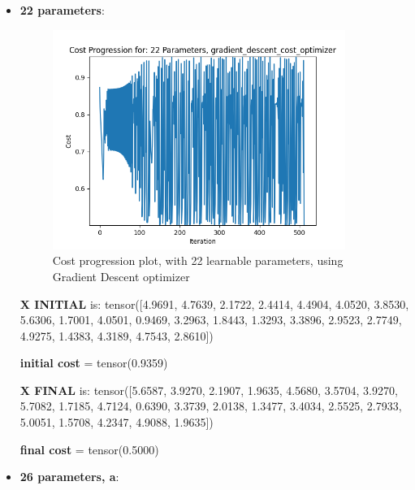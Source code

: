 \documentclass[inscr,ack,preface]{diphdthesis}
\begin{document}
\begin{itemize}
    \item \textbf{22 parameters}:

\begin{figure}[ht]
\begin{center}
    \includegraphics[width=0.9\textwidth]{plots/22.png}
    \caption{Cost progression plot, with 22 learnable parameters, using Gradient Descent optimizer} 
    \label{fig:enter-label}
    \end{center}
\end{figure}

\textbf{X INITIAL} is: tensor([4.9691, 4.7639, 2.1722, 2.4414, 4.4904, 4.0520, 3.8530, 5.6306, 1.7001,
        4.0501, 0.9469, 3.2963, 1.8443, 1.3293, 3.3896, 2.9523, 2.7749, 4.9275,
        1.4383, 4.3189, 4.7543, 2.8610])
        
\textbf{initial cost}  = tensor(0.9359)

\textbf{X FINAL} is: tensor([5.6587, 3.9270, 2.1907, 1.9635, 4.5680, 3.5704, 3.9270, 5.7082, 1.7185,
        4.7124, 0.6390, 3.3739, 2.0138, 1.3477, 3.4034, 2.5525, 2.7933, 5.0051,
        1.5708, 4.2347, 4.9088, 1.9635])

\textbf{final cost} = tensor(0.5000)

\item \textbf{26 parameters, a}:


\end{itemize}
\end{document}
